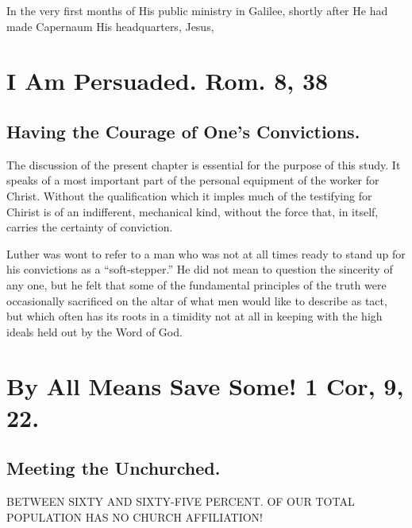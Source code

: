 \documentclass[
]{book}
\begin{document}
In the very first months of His public ministry in Galilee, shortly after He had made Capernaum His headquarters, Jesus,

\hypertarget{i-am-persuaded.-rom.-8-38}{%
\chapter{I Am Persuaded. Rom. 8, 38}\label{i-am-persuaded.-rom.-8-38}}

\hypertarget{having-the-courage-of-ones-convictions.}{%
\section*{Having the Courage of One's Convictions.}\label{having-the-courage-of-ones-convictions.}}

The discussion of the present chapter is essential for the purpose of this study. It speaks of a most important part of the personal equipment of the worker for Christ. Without the qualification which it imples much of the testifying for Chirist is of an indifferent, mechanical kind, without the force that, in itself, carries the certainty of conviction.

Luther was wont to refer to a man who was not at all times ready to stand up for his convictions as a ``soft-stepper.'' He did not mean to question the sincerity of any one, but he felt that some of the fundamental principles of the truth were occasionally sacrificed on the altar of what men would like to describe as tact, but which often has its roots in a timidity not at all in keeping with the high ideals held out by the Word of God.

\hypertarget{by-all-means-save-some-1-cor-9-22.}{%
\chapter{By All Means Save Some! 1 Cor, 9, 22.}\label{by-all-means-save-some-1-cor-9-22.}}

\hypertarget{meeting-the-unchurched.}{%
\section*{Meeting the Unchurched.}\label{meeting-the-unchurched.}}

BETWEEN SIXTY AND SIXTY-FIVE PERCENT. OF OUR TOTAL POPULATION HAS NO CHURCH AFFILIATION!
\end{document}
